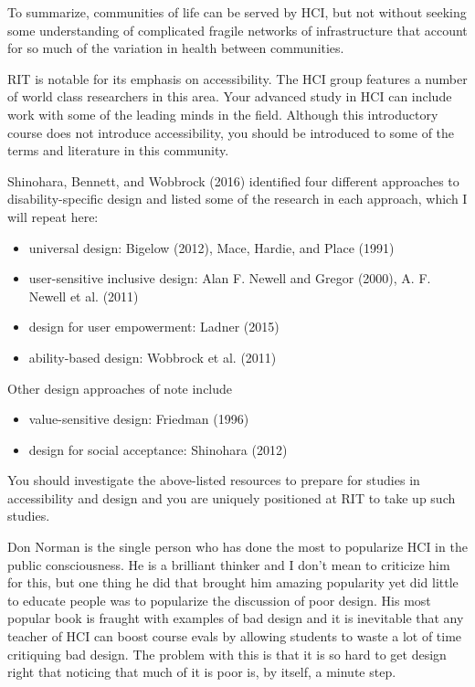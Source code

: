 To summarize, communities of life can be served by HCI, but not without
seeking some understanding of complicated fragile networks of
infrastructure that account for so much of the variation in health
between communities.

\hypertarget{disability-specific-design}{%
\label{disability-specific-design}}

RIT is notable for its emphasis on accessibility. The HCI group features
a number of world class researchers in this area. Your advanced study in
HCI can include work with some of the leading minds in the field.
Although this introductory course does not introduce accessibility, you
should be introduced to some of the terms and literature in this
community.

Shinohara, Bennett, and Wobbrock (2016) identified four different
approaches to disability-specific design and listed some of the research
in each approach, which I will repeat here:

\begin{itemize}
\tightlist
\item
  universal design: Bigelow (2012), Mace, Hardie, and Place (1991)
\item
  user-sensitive inclusive design: Alan F. Newell and Gregor (2000), A.
  F. Newell et al. (2011)
\item
  design for user empowerment: Ladner (2015)
\item
  ability-based design: Wobbrock et al. (2011)
\end{itemize}

Other design approaches of note include

\begin{itemize}
\tightlist
\item
  value-sensitive design: Friedman (1996)
\item
  design for social acceptance: Shinohara (2012)
\end{itemize}

You should investigate the above-listed resources to prepare for studies
in accessibility and design and you are uniquely positioned at RIT to
take up such studies.

\hypertarget{popularization-via-bad-design}{%
\label{popularization-via-bad-design}}

Don Norman is the single person who has done the most to popularize HCI
in the public consciousness. He is a brilliant thinker and I don't mean
to criticize him for this, but one thing he did that brought him amazing
popularity yet did little to educate people was to popularize the
discussion of poor design. His most popular book is fraught with
examples of bad design and it is inevitable that any teacher of HCI can
boost course evals by allowing students to waste a lot of time
critiquing bad design. The problem with this is that it is so hard to
get design right that noticing that much of it is poor is, by itself, a
minute step.

